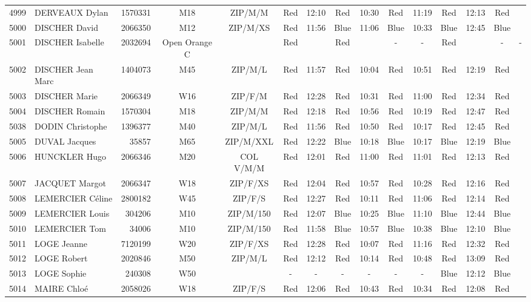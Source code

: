 \documentclass{report}
\begin{document}
\begin{longtable}{|c|l|r|c|c|*{5}{cc|}}
    4999 & DERVEAUX Dylan & 1570331 & M18 & ZIP/M/M & Red & 12:10 & Red & 10:30 & Red & 11:19 & Red & 12:13 & Red &  \\
    5000 & DISCHER David & 2066350 & M12 & ZIP/M/XS & Red & 11:56 & Blue & 11:06 & Blue & 10:33 & Blue & 12:45 & Blue &  \\
    5001 & DISCHER Isabelle & 2032694 & Open Orange C &   & Red &   & Red &   & - &  - & Red &   & - &  -\\
    5002 & DISCHER Jean Marc & 1404073 & M45 & ZIP/M/L & Red & 11:57 & Red & 10:04 & Red & 10:51 & Red & 12:19 & Red &  \\
    5003 & DISCHER Marie & 2066349 & W16 & ZIP/F/M & Red & 12:28 & Red & 10:31 & Red & 11:00 & Red & 12:34 & Red &  \\
    5004 & DISCHER Romain & 1570304 & M18 & ZIP/M/M & Red & 12:18 & Red & 10:56 & Red & 10:19 & Red & 12:47 & Red &  \\
    5038 & DODIN Christophe & 1396377 & M40 & ZIP/M/L & Red & 11:56 & Red & 10:50 & Red & 10:17 & Red & 12:45 & Red &  \\
    5005 & DUVAL Jacques & 35857 & M65 & ZIP/M/XXL & Red & 12:22 & Blue & 10:18 & Blue & 10:17 & Blue & 12:19 & Blue &  \\
    5006 & HUNCKLER Hugo & 2066346 & M20 & COL V/M/M & Red & 12:01 & Red & 11:00 & Red & 11:01 & Red & 12:13 & Red &  \\
    5007 & JACQUET Margot & 2066347 & W18 & ZIP/F/XS & Red & 12:04 & Red & 10:57 & Red & 10:28 & Red & 12:16 & Red &  \\
    5008 & LEMERCIER Céline & 2800182 & W45 & ZIP/F/S & Red & 12:27 & Red & 10:11 & Red & 11:06 & Red & 12:14 & Red &  \\
    5009 & LEMERCIER Louis & 304206 & M10 & ZIP/M/150 & Red & 12:07 & Blue & 10:25 & Blue & 11:10 & Blue & 12:44 & Blue &  \\
    5010 & LEMERCIER Tom & 34006 & M10 & ZIP/M/150 & Red & 11:58 & Blue & 10:57 & Blue & 10:38 & Blue & 12:10 & Blue &  \\
    5011 & LOGE Jeanne & 7120199 & W20 & ZIP/F/XS & Red & 12:28 & Red & 10:07 & Red & 11:16 & Red & 12:32 & Red &  \\
    5012 & LOGE Robert & 2020846 & M50 & ZIP/M/L & Red & 12:12 & Red & 10:14 & Red & 10:48 & Red & 13:09 & Red &  \\
    5013 & LOGE Sophie & 240308 & W50 &   & - &  - & - &  - & - &  - & Blue & 12:12 & Blue &  \\
    5014 & MAIRE Chloé & 2058026 & W18 & ZIP/F/S & Red & 12:06 & Red & 10:43 & Red & 10:34 & Red & 12:08 & Red &  \\

\end{longtable}
\end{document}
